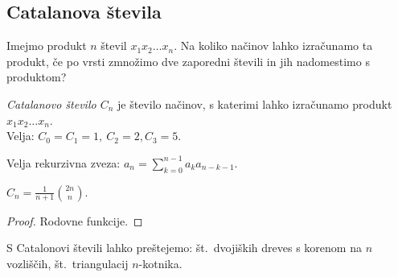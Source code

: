 \subsection{Catalanova števila}
Imejmo produkt $n$ števil $x_1x_2 \ldots x_n$. Na koliko načinov lahko izračunamo ta produkt, če po vrsti zmnožimo dve zaporedni števili in jih nadomestimo s produktom?

\begin{definicija}
    \emph{Catalanovo število $C_n$} je število načinov, s katerimi lahko izračunamo produkt $x_1x_2 \ldots x_n$. \\ Velja: \(C_0 = C_1 = 1, \ C_2 = 2, C_3 = 5\).
\end{definicija}

\begin{trditev}
    Velja rekurzivna zveza: $a_n = \sum_{k=0}^{n-1}a_ka_{n-k-1}$.
\end{trditev}

\begin{trditev}
    $C_n = \frac{1}{n+1} \binom{2n}{n}$.
\end{trditev}

\begin{proof}
    Rodovne funkcije.
\end{proof}

\begin{primer}
    S Catalonovi števili lahko preštejemo: št.\ dvojiških dreves s korenom na \(n\) vozliščih, št.\ triangulacij \(n\)-kotnika.
\end{primer}
